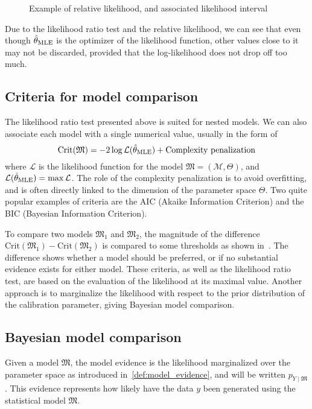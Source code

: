 \documentclass[../../Main_ManuscritThese.tex]{subfiles}
\newcommand\imgpath{/home/victor/acadwriting/Manuscrit/Text/Chapter2/img/}
\begin{document}
\begin{figure}[ht]
  \centering
  \label{fig:label} 
  
  \caption{Example of relative likelihood, and associated likelihood interval}
\end{figure}

Due to the likelihood ratio test and the relative likelihood, we can see that even though $\hat{\theta}_{\mathrm{MLE}}$ is the optimizer of the likelihood function, other values close to it may not be discarded, provided that the log-likelihood does not drop off too much.

\subsection{Criteria for model comparison}
\label{sec:criteria_AIC}
The likelihood ratio test presented above is suited for nested models. We can also associate each model with a single numerical value, usually in the form of
\begin{equation}
  \mathrm{Crit}(\mathfrak{M})=-2 \log \mathcal{L} (\hat{\theta}_{\mathrm{MLE}}) + \text{Complexity penalization}
\end{equation}
where $\mathcal{L}$ is the likelihood function for the model $\mathfrak{M} = (\mathcal{M},\Theta)$, and $\mathcal{L}(\hat{\theta}_{\mathrm{MLE}}) = \max \mathcal{L}$. The role of the complexity penalization is to avoid overfitting, and is often directly linked to the dimension of the parameter space $\Theta$.
Two quite popular examples of criteria are the AIC (Akaike Information Criterion) and the BIC (Bayesian Information Criterion).

To compare two models $\mathfrak{M}_1$ and $\mathfrak{M}_2$, the magnitude of the difference $\mathrm{Crit}(\mathfrak{M}_1) - \mathrm{Crit}(\mathfrak{M}_2)$ is compared to some thresholds as shown in~\cite{burnham_multimodel_2004}.
The difference shows whether a model should be preferred, or if no substantial evidence exists for either model.
These criteria, as well as the likelihood ratio test, are based on the evaluation of the likelihood at its maximal value. Another approach is to marginalize the likelihood with respect to the prior distribution of the calibration parameter, giving Bayesian model comparison.

\subsection{Bayesian model comparison}
Given a model $\mathfrak{M}$, the model evidence is the likelihood marginalized over the parameter space as introduced in~\cref{def:model_evidence}, and will be written $p_{Y\mid \mathfrak{M}}$. This evidence represents how likely have the data $y$ been generated using the statistical model $\mathfrak{M}$.
\end{document}
